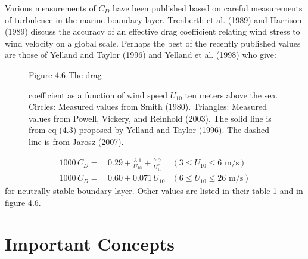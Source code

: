Various measurements of $C_D$ have been published based on careful measurements
of turbulence in the marine boundary layer. Trenberth et al.
(1989) and Harrison (1989) discuss the accuracy of an
effective drag coefficient relating wind
stress to wind velocity on a global scale. Perhaps the
best of the recently published values are those of Yelland and Taylor (1996) and Yelland et al.
(1998) who give:

\begin{figure}[t!]
\footnotesize
Figure 4.6 The drag\rule{0mm}{3ex} coefficient as a function of wind speed $U_{10}$ ten meters
above the sea. Circles: Measured values from Smith (1980). Triangles: Measured values from
Powell, Vickery, and Reinhold (2003). The solid line is from eq (4.3) proposed by Yelland
and Taylor (1996). The dashed line is from Jarosz (2007).
\label{fig:dragcoefficient}
\vspace{-3ex}
\end{figure}

\begin{subequations}
\begin {align}
1000 \, C_D = & \,0.29 + \frac{3.1}{U_{10}} + \frac{7.7}{U_{10}^2} & \left( 3 \le
U_{10}
\le 6 \text{ m/s}\right) \\
 1000 \, C_D = & \,0.60 + 0.071 \, U_{10} & \left( 6 \le U_{10} \le 26 \text{ m/s}
\right)
\end{align}
\end{subequations}
for neutrally stable boundary layer. Other values are listed in their table 1 and
in figure 4.6.

\section{Important Concepts}

